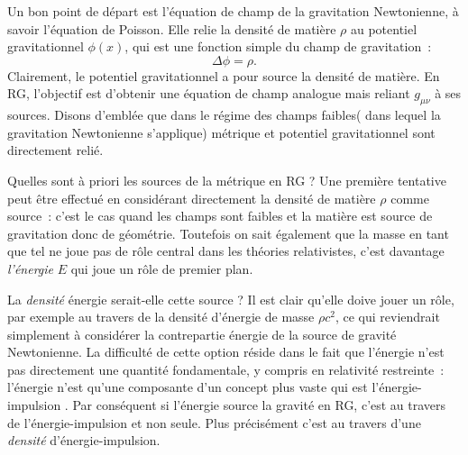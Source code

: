 Un bon point de départ est l'équation de champ de la gravitation Newtonienne, à savoir l'équation de Poisson. Elle relie la densité de matière $\rho$ au potentiel gravitationnel $\phi(x)$, qui est une fonction simple du champ de gravitation~:
\begin{equation}
\Delta \phi =\rho.
\label{e:poisson}
\end{equation}
Clairement, le potentiel gravitationnel a pour source la densité de matière. En RG, l'objectif est d'obtenir une équation de champ analogue mais reliant $g_{\mu\nu}$ à ses sources. Disons d'emblée que dans le régime des champs faibles( dans lequel la gravitation Newtonienne s'applique) métrique et potentiel gravitationnel sont directement relié.

Quelles sont à priori les sources de la métrique en RG ? Une première tentative peut être effectué en considérant directement la densité de matière $\rho$ comme source~: c'est le cas quand les champs sont faibles et la matière est source de gravitation donc de géométrie. Toutefois on sait également que la masse en tant que tel ne joue pas de rôle central dans les théories relativistes, c'est davantage \textit{l'énergie} $E$ qui joue un rôle de premier plan. 

La \textit{densité} énergie serait-elle cette source ? Il est clair qu'elle doive jouer un rôle, par exemple au travers de la densité d'énergie de masse $\rho c^2$, ce qui reviendrait simplement à considérer la contrepartie énergie de la source de gravité Newtonienne. La difficulté de cette option réside dans le fait que l'énergie n'est pas directement une quantité fondamentale, y compris en relativité restreinte~: l'énergie n'est qu'une composante d'un concept plus vaste qui est l'énergie-impulsion . Par conséquent si l'énergie source la gravité en RG, c'est au travers de l'énergie-impulsion et non seule. Plus précisément c'est au travers d'une \textit{densité} d'énergie-impulsion.

